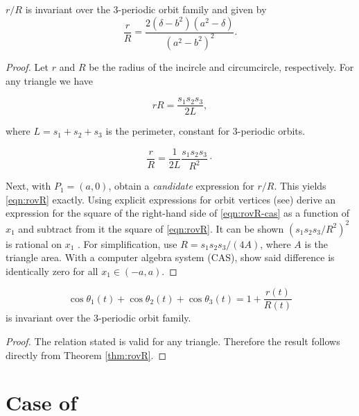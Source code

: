 \begin{theorem}
\label{thm:rovR}
$r/R$ is invariant over the 3-periodic orbit family and given by
\begin{equation}
\label{eqn:rovR}
\frac{r}{R}=\frac{2 (\delta-b^2)(a^2-\delta)}{(a^2-b^2)^2}.
\end{equation}
\end{theorem}
\begin{proof}
Let $r$ and $R$ be the radius of the incircle and circumcircle, respectively. For any triangle \cite{coxeter67} we have

\begin{equation*}
 rR=\frac{s_1s_2s_3}{2 L}, 
\end{equation*}

\noindent where $L=s_1+s_2+s_3$ is the perimeter, constant for 3-periodic orbits. %

\begin{equation}
\frac{r}{R}=\frac{1}{2L} \frac{s_1s_2s_3}{R^2}\cdot
\label{eqn:rovR-cas}
\end{equation}

Next, with $P_1=(a,0)$, obtain a {\em candidate} expression for $r/R$. This yields \cref{eqn:rovR} exactly. Using explicit expressions for orbit vertices (see) %
derive an expression for the square of the right-hand side of \cref{eqn:rovR-cas} as a function of $x_1$ and subtract from it the square of \cref{eqn:rovR}. It can be shown $\left(s_1s_2s_3/R^2\right)^2$ is rational on $x_1$ \cite{garcia2020-ellipses}. For simplification, use $R=s_1 s_2 s_3/(4A)$, where $A$ is the triangle area. With a computer algebra system (CAS), show said difference is identically zero for all $x_1\in(-a,a)$.
\end{proof}

\begin{corollary}
\[\cos\theta_1(t)+\cos\theta_2(t)+\cos\theta_3(t)=1+\frac{r(t)}{R(t)} \]
is invariant over the 3-periodic orbit family.
\end{corollary}

\begin{proof}
The relation stated is valid for any triangle. Therefore the result follows directly from Theorem \ref{thm:rovR}.
\end{proof}
\section{Case of }

